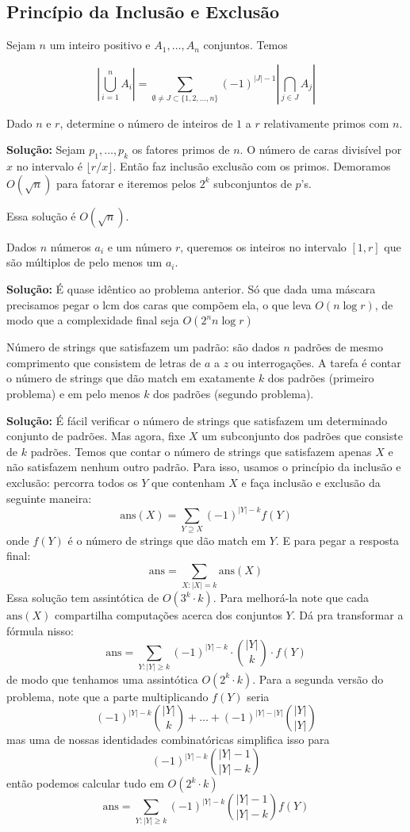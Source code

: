 \subsection{Princípio da Inclusão e Exclusão}

Sejam $n$ um inteiro positivo e $A_1, \dots, A_n$ conjuntos. Temos

$$\left\vert \bigcup\limits_{i=1}^n A_i \right\vert = \sum\limits_{\emptyset \neq J \subset \{1, 2, \dots, n \}} (-1)^{|J|-1} \left\vert \bigcap\limits_{j \in J} A_j \right\vert$$

 Dado $n$ e $r$, determine o número de inteiros de $1$ a $r$ relativamente primos com $n$.

\textbf{Solução:} Sejam $p_1, \dots, p_k$ os fatores primos de $n$. O número de caras divisível por $x$ no intervalo é $\lfloor r/x \rfloor$. Então faz inclusão exclusão com os primos. Demoramos $O(\sqrt{n})$ para fatorar e iteremos pelos $2^k$ subconjuntos de $p$'s.


Essa solução é $O(\sqrt{n})$.

 Dados $n$ números $a_i$ e um número $r$, queremos os inteiros no intervalo $[1, r]$ que são múltiplos de pelo menos um $a_i$.

\textbf{Solução:} É quase idêntico ao problema anterior. Só que dada uma máscara precisamos pegar o lcm dos caras que compõem ela, o que leva $O(n \log r)$, de modo que a complexidade final seja  $O(2^n n \log r)$

 Número de strings que satisfazem um padrão: são dados $n$ padrões de mesmo comprimento que consistem de letras de $a$ a $z$ ou interrogações. A tarefa é contar o número de strings que dão match em exatamente $k$ dos padrões (primeiro problema) e em pelo menos $k$ dos padrões (segundo problema).

\textbf{Solução:} É fácil verificar o número de strings que satisfazem um determinado conjunto de padrões. Mas agora, fixe $X$ um subconjunto dos padrões que consiste de $k$ padrões. Temos que contar o número de strings que satisfazem apenas $X$ e não satisfazem nenhum outro padrão. Para isso, usamos o princípio da inclusão e exclusão: percorra todos os $Y$ que contenham $X$ e faça inclusão e exclusão da seguinte maneira:
$$\text{ans}(X) = \sum\limits_{Y \supseteq X} (-1)^{|Y|-k} f(Y)$$
onde $f(Y)$ é o número de strings que dão match em $Y$. E para pegar a resposta final:
$$\text{ans} = \sum\limits_{X : |X| = k} \text{ans}(X)$$
Essa solução tem assintótica de $O(3^k \cdot k)$. Para melhorá-la note que cada $\text{ans}(X)$ compartilha computações acerca dos conjuntos $Y$. Dá pra transformar a fórmula nisso:
$$ \text{ans} = \sum\limits_{Y: |Y| \geq k} (-1)^{|Y|-k} \cdot {|Y| \choose k} \cdot f(Y)$$
de modo que tenhamos uma assintótica $O(2^k \cdot k)$. Para a segunda versão do problema, note que a parte multiplicando $f(Y)$ seria
$$ (-1)^{|Y|-k} {|Y| \choose k} + \dots + (-1)^{|Y|-|Y|} {|Y| \choose |Y|}$$
mas uma de nossas identidades combinatóricas simplifica isso para
$$ (-1)^{|Y| - k} {|Y| - 1 \choose |Y| - k}$$
então podemos calcular tudo em $O(2^k \cdot k)$
$$\text{ans} = \sum\limits_{Y : |Y| \geq k} (-1)^{|Y|-k} {|Y|-1 \choose |Y| - k} f(Y)$$

